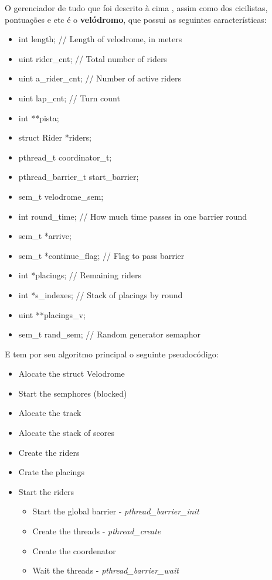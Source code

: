 \documentclass[12pt,a4paper]{article}
\begin{document}
    O gerenciador de tudo que foi descrito à cima , assim como dos cicilistas, pontuações e etc é o \textbf{velódromo}, que possui as seguintes características:
    
    \begin{itemize}
    \item int length; // Length of velodrome, in meters
    \item {uint rider\_cnt}; // Total number of riders
    \item {uint a\_rider\_cnt}; // Number of active riders
    \item {uint lap\_cnt}; // Turn count
    \item int **pista;
    \item struct Rider *riders;
    \item {pthread\_t coordinator\_t};
    \item {pthread\_barrier\_t start\_barrier};
    \item {sem\_t velodrome\_sem};
    \item {int round\_time}; // How much time passes in one barrier round
    \item {sem\_t *arrive};
    \item {sem\_t *continue\_flag}; // Flag to pass barrier
    \item int *placings; // Remaining riders
    \item {int *s\_indexes}; // Stack of placings by round
    \item {uint **placings\_v};
    \item {sem\_t rand\_sem}; // Random generator semaphor    
    \end{itemize}

    E tem por seu algoritmo principal o seguinte pseudocódigo:
    
    \begin{itemize}
    \item Alocate the struct Velodrome
    \item Start the semphores (blocked)
    \item Alocate the track
    \item Alocate the stack of scores
    \item Create the riders
    \item Crate the placings
    \item Start the riders
    \begin{itemize}
      \item Start the global barrier - \textit{pthread\_barrier\_init}
      \item Create the threads - \textit{pthread\_create}
      \item Create the coordenator %
      \item Wait the threads - \textit{pthread\_barrier\_wait} %
    \end{itemize}
    \end{itemize}
    
\end{document}
